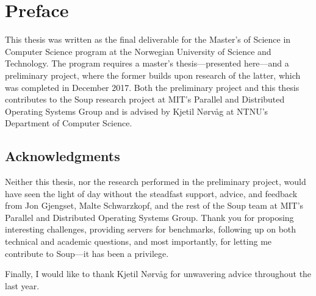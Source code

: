 \section*{Preface}

This thesis was written as the final deliverable for the Master's of Science in
Computer Science program at the Norwegian University of Science and Technology.
The program requires a master's thesis---presented here---and a preliminary
project, where the former builds upon research of the latter, which was
completed in December 2017. Both the preliminary project and this thesis
contributes to the Soup research project at MIT's Parallel and Distributed
Operating Systems Group and is advised by Kjetil Nørvåg at NTNU's Department of
Computer Science.

\subsection*{Acknowledgments}

Neither this thesis, nor the research performed in the preliminary project,
would have seen the light of day without the steadfast support, advice, and
feedback from Jon Gjengset, Malte Schwarzkopf, and the rest of the Soup team at
MIT's Parallel and Distributed Operating Systems Group. Thank you for proposing
interesting challenges, providing servers for benchmarks, following up on both
technical and academic questions, and most importantly, for letting me
contribute to Soup---it has been a privilege.

Finally, I would like to thank Kjetil Nørvåg for unwavering advice throughout
the last year.

\newpage
